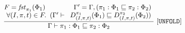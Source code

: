 \begin{gather*}
\frac{ \begin{matrix}
\text{\codeme{F = \m{fst}_{\pure{\pi_1}}(\effect_1)\qquad\qquad \Gamma^\prime = \Gamma,  (
\pure{\pi_1} : \effect_1 \CONTAIN \pure{\pi_2} : \effect_2
)} }\\
    \text{\codeme{\forall (I, \pi, t)\in F. \   (\Gamma^\prime  \vdash \   D_{(I, \pi, t)}^{\pure{\pi_1}}( \effect_1) \CONTAIN    D_{(I, \pi, t)}^{\pure{\pi_2}}( \effect_2) )}}
  \end{matrix}}
   { \text{\codeme{  \Gamma  \vdash \pure{\pi_1} : \effect_1 \CONTAIN \pure{\pi_2} : \effect_2 }}}\  \codeme{[UNFOLD]} 
\end{gather*}